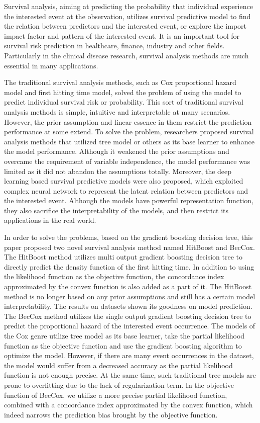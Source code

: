 
\begin{englishabstract}
	Survival analysis, aiming at predicting the probability that individual experience the interested event at the observation, utilizes survival predictive model to find the relation between predictors and the interested event, or explore the import impact factor and pattern of the interested event. It is an important tool for survival risk prediction in healthcare, finance, industry and other fields. Particularly in the clinical disease research, survival analysis methods are much essential in many applications.
	
	The traditional survival analysis methods, such as Cox proportional hazard model and first hitting time model, solved the problem of using the model to predict individual survival risk or probability. This sort of traditional survival analysis methods is simple, intuitive and interpretable at many scenarios. However, the prior assumption and linear essence in them restrict the prediction performance at some extend. To solve the problem, researchers proposed survival analysis methods that utilized tree model or others as its base learner to enhance the model performance. Although it weakened the prior assumptions and overcame the requirement of variable independence, the model performance was limited as it did not abandon the assumptions totally. Moreover, the deep learning based survival predictive models were also proposed, which exploited complex neural network to represent the latent relation between predictors and the interested event. Although the models have powerful representation function, they also sacrifice the interpretability of the models, and then restrict its applications in the real world.

    In order to solve the problems, based on the gradient boosting decision tree, this paper proposed two novel survival analysis method named HitBoost and BecCox. The HitBoost method utilizes multi output gradient boosting decision tree to directly predict the density function of the first hitting time. In addition to using the likelihood function as the objective function, the concordance index approximated by the convex function is also added as a part of it. The HitBoost method is no longer based on any prior assumptions and still has a certain model interpretability. The results on datasets shown its goodness on model prediction. The BecCox method utilizes the single output gradient boosting decision tree to predict the proportional hazard of the interested event occurrence. The models of the Cox genre utilize tree model as its base learner, take the partial likelihood function as the objective function and use the gradient boosting algorithm to optimize the model. However, if there are many event occurrences in the dataset, the model would suffer from a decreased accuracy as the partial likelihood function is not enough precise. At the same time, such traditional tree models are prone to overfitting due to the lack of regularization term. In the objective function of BecCox, we utilize a more precise partial likelihood function, combined with a concordance index approximated by the convex function, which indeed narrows the prediction bias brought by the objective function.


\end{englishabstract}
